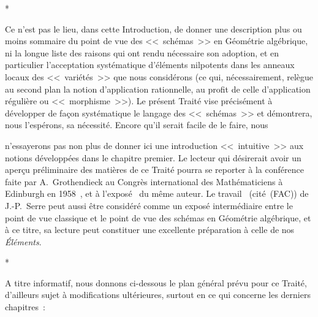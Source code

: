 \bigskip
\begin{center}*\quad*\quad*\end{center}
\bigskip

Ce n'est pas le lieu, dans cette Introduction, de donner une description plus ou moins sommaire du point de vue des <<~schémas~>> en Géométrie algébrique, ni la longue liste des raisons qui ont rendu nécessaire son adoption, et en particulier l'acceptation systématique d'éléments nilpotents dans les anneaux locaux des <<~variétés~>> que nous considérons (ce qui, nécessairement, relègue au second plan la notion d'application rationnelle, au profit de celle d'application régulière ou <<~morphisme~>>).
Le présent Traité vise précisément à développer de façon systématique le langage des <<~schémas~>> et démontrera, nous l'espérons, sa nécessité.
Encore qu'il serait facile de le faire, nous

n'essayerons pas non plus de donner ici une introduction <<~intuitive~>> aux notions développées dans le chapitre premier.
Le lecteur qui désirerait avoir un aperçu préliminaire des matières de ce Traité pourra se reporter à la conférence faite par A.~Grothendieck au Congrès international des Mathématiciens à Edinburgh en 1958~\cite{I-7}, et à l'exposé~\cite{I-8} du même auteur.
Le travail~\cite{I-14} (cité~(FAC)) de J.-P.~Serre peut aussi être considéré comme un exposé intermédiaire entre le point de vue classique et le point de vue des schémas en Géométrie algébrique, et à ce titre, sa lecture peut constituer une excellente préparation à celle de nos \emph{Éléments}.

\bigskip
\begin{center}*\quad*\quad*\end{center}
\bigskip

A titre informatif, nous donnons ci-dessous le plan général prévu pour ce Traité, d'ailleurs sujet à modifications ultérieures, surtout en ce qui concerne les derniers chapitres~:

